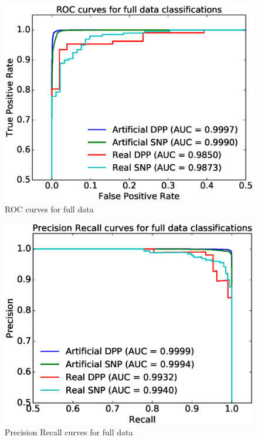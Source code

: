 \documentclass{pasj01}
\begin{document}
%
\begin{figure}[ht]
  \begin{center}
     \includegraphics[width=\columnwidth]{figures/Fulldata_ROC.eps}
  \end{center}
  \caption{%
  ROC curves for full data
  }%
  \label{fig:fullROC}
\end{figure}
%
%
\begin{figure}[ht]
  \begin{center}
     \includegraphics[width=\columnwidth]{figures/Fulldata_PreRec.eps}
  \end{center}
  \caption{%
  Precision Recall curves for full data
  }%
  \label{fig:fullPreRec}
\end{figure}
%
\end{document}
